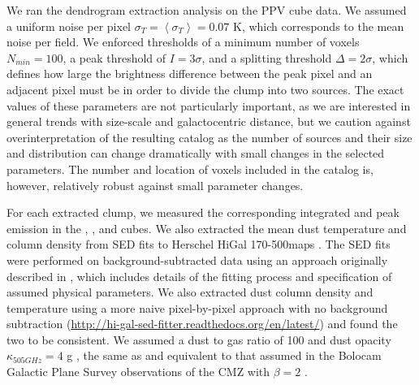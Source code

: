 
We ran the dendrogram extraction analysis on the \threeohthree PPV cube data.
We assumed a uniform noise per pixel $\sigma_{T}=\left<\sigma_T\right>=0.07$ K,
which corresponds to the mean noise per field.  We enforced thresholds of a
minimum number of voxels $N_{min}=100$, a peak threshold of $I = 3\sigma$, and
a splitting threshold $\Delta = 2\sigma$, which defines how large the
brightness difference between the peak pixel and an adjacent pixel must be in
order to divide the clump into two sources.  The exact values of these
parameters are not particularly important, as we are interested in general
trends with size-scale and galactocentric distance, but we caution against
overinterpretation of the resulting catalog as the number of sources and their
size and distribution can change dramatically with small changes in the
selected parameters.  The number and location of voxels included in the catalog
is, however, relatively robust against small parameter changes.

For each extracted clump, we measured the corresponding integrated and peak
emission in the \threeohthree, \threetwoone, and \thirteenco cubes.  We also
extracted the mean dust temperature and column density from SED fits to
Herschel HiGal 170-500\um maps \citep{Molinari2010a,Traficante2011a}.  The SED
fits were performed on background-subtracted data using an approach originally
described in \citet{Battersby2011a}, which includes details of the fitting
process and specification of assumed physical parameters.  We also extracted
dust column density and temperature using a more naive pixel-by-pixel approach
with no background subtraction
(\url{http://hi-gal-sed-fitter.readthedocs.org/en/latest/}) and found the two
to be consistent.  We assumed a dust to gas ratio of 100 and dust opacity
$\kappa_{505 GHz} = 4$ g \persc, the same as \citet{Battersby2011a} and
equivalent to that assumed in the Bolocam Galactic Plane Survey observations of
the CMZ with $\beta=2$ \citep[$\kappa_{271.1 GHz}=1.1$ g
\persc][]{Bally2010a, Aguirre2011a, Ginsburg2013a}. 

